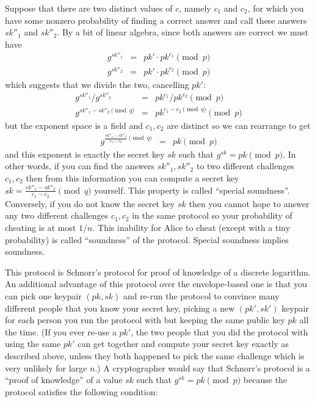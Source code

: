 \documentclass[envcountsame]{llncs}
\begin{document}
Suppose that there are two distinct values of $c$, namely $c_1$ and $c_2$, for
which you have some nonzero probability of finding a correct answer and call
these answers $sk''_1$ and $sk''_2$. By a bit of linear algebra, since both
answers are correct we must have
\begin{eqnarray}
g^{sk''_1} & = & pk' \cdot pk^{c_1} \pmod{p} \\
g^{sk''_2} & = & pk' \cdot pk^{c_2} \pmod{p}
\end{eqnarray}
which suggests that we divide the two, cancelling $pk'$:
\begin{eqnarray}
g^{sk''_1} / g^{sk''_2} & = & pk^{c_1} / pk^{c_2} \pmod{p} \\
g^{sk''_1 - sk''_2 \pmod{q}} & = & pk^{c_1 - c_2 \pmod{q}} \pmod{p}
\end{eqnarray}
but the exponent space is a field and $c_1, c_2$ are distinct so we can
rearrange to get
\begin{eqnarray}
g^{\frac{sk''_1 - sk''_2}{c_1 - c_2}\pmod{q}} & = & pk \pmod{p}
\end{eqnarray}
and this exponent is exactly the secret key $sk$ such that $g^{sk} = pk
\pmod{p}$.
In other words, if you can find the answers $sk''_1, sk''_2$ to two different
challenges $c_1, c_2$ then from this information you can compute a secret key
$sk = \frac{sk''_1 - sk''_2}{c_1 - c_2}\pmod{q}$ yourself. This property is
called ``special soundness''. Conversely, if you do not know the secret key $sk$
then you cannot hope to answer any two different challenges $c_1, c_2$ in the
same protocol so your probability of cheating is at most $1/n$. This inability
for Alice to cheat (except with a tiny probability) is called ``soundness'' of
the protocol. Special soundness implies soundness.

This protocol is Schnorr's protocol \cite{S91} for proof of knowledge of a
discrete logarithm. An additional advantage of this protocol over the
envelope-based one is that you can pick one keypair $(pk, sk)$ and re-run the
protocol to convince many different people that you know your secret key,
picking a new $(pk', sk')$ keypair for each person you run the protocol with but
keeping the same public key $pk$ all the time. (If you ever re-use a $pk'$, the
two people that you did the protocol with using the same $pk'$ can get together
and compute your secret key exactly as described above, unless they both
happened to pick the same challenge which is very unlikely for large $n$.)
A cryptographer would say that Schnorr's protocol is a ``proof of knowledge'' of
a value $sk$ such that $g^{sk} = pk \pmod{p}$ because the protocol satisfies
the following condition:
\end{document}
